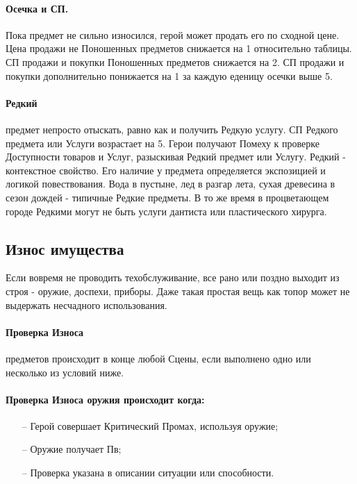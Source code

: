 \paragraph{Осечка и СП.} Пока предмет не сильно износился, герой может продать его по сходной цене. Цена продажи не Поношенных предметов снижается на 1 относительно таблицы.
\newline СП продажи и покупки Поношенных предметов снижается на 2.
\newline СП продажи и покупки дополнительно понижается на 1 за каждую еденицу осечки выше 5.
\paragraph{Редкий} предмет непросто отыскать, равно как и получить Редкую услугу. СП Редкого предмета или Услуги возрастает на 5. Герои получают Помеху к проверке Доступности товаров и Услуг, разыскивая Редкий предмет или Услугу. 
\newline Редкий - контекстное свойство. Его наличие у предмета определяется экспозицией и логикой повествования. Вода в пустыне, лед в разгар лета, сухая древесина в сезон дождей - типичные Редкие предметы. В то же время в процветающем городе Редкими могут не быть услуги дантиста или пластического хирурга.

\subsection{Износ имущества}
Если вовремя не проводить техобслуживание, все рано или поздно выходит из строя - оружие, доспехи, приборы. Даже такая простая вещь как топор может не выдержать несчадного использования.

\paragraph{Проверка Износа} предметов происходит в конце любой Сцены, если выполнено одно или несколько из условий ниже.
\paragraph{Проверка Износа оружия происходит когда:} 
\begin{itemize}
    \item[--] Герой совершает Критический Промах, используя оружие; 
    \item[--] Оружие получает Пв;
    \item[--] Проверка указана в описании ситуации или способности.
\end{itemize}
